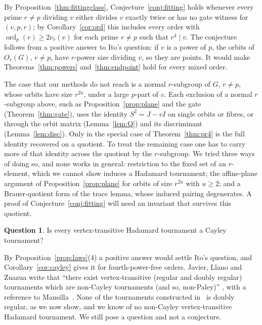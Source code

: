 \documentclass[11pt]{amsart}
\theoremstyle{definition}
\newtheorem{question}[theorem]{Question}
\theoremstyle{remark}
\begin{document}
By Proposition~\ref{thm:fittingclass}, Conjecture~\ref{conj:fitting} holds whenever every prime $r\ne p$ dividing $v$ either divides $v$ exactly twice or has no gate witness for $(v,p,r)$; by Corollary~\ref{cor:ord} this includes every order with $\operatorname{ord}_p(r)\ge2\nu_r(v)$ for each prime $r\ne p$ such that $r^4\mid v$. The conjecture follows from a positive answer to Ito's question: if $v$ is a power of $p$, the orbits of $O_r(G)$, $r\ne p$, have $r$-power size dividing $v$, so they are points. It would make Theorems~\ref{thm:powers} and~\ref{thm:endpoint} hold for every mixed order.

The case that our methods do not reach is a normal $r$-subgroup of $G$, $r\ne p$, whose orbits have size $r^{2u}$, under a large $p$-part of $v$. Each exclusion of a normal $r$-subgroup above, such as Proposition~\ref{prop:plane} and the gate (Theorem~\ref{thm:gate}), uses the identity $S^2=J-vI$ on single orbits or fibres, or through the orbit matrix (Lemma~\ref{lem:Q}) and its discriminant (Lemma~\ref{lem:disc}). Only in the special case of Theorem~\ref{thm:pr4} is the full identity recovered on a quotient. To treat the remaining case one has to carry more of that identity across the quotient by the $r$-subgroup. We tried three ways of doing so, and none works in general: restriction to the fixed set of an $r$-element, which we cannot show induces a Hadamard tournament; the affine-plane argument of Proposition~\ref{prop:plane} for orbits of size $r^{2u}$ with $u\ge2$; and a Brauer-quotient form of the trace lemma, whose induced pairing degenerates. A proof of Conjecture~\ref{conj:fitting} will need an invariant that survives this quotient.

\begin{question}\label{q:cayley}
Is every vertex-transitive Hadamard tournament a Cayley tournament?
\end{question}

By Proposition~\ref{prop:laws}(4) a positive answer would settle Ito's question, and Corollary~\ref{cor:cayley} gives it for fourth-power-free orders. Javier, Llano and Zuazua write that ``there exist vertex-transitive (regular and doubly regular) tournaments which are non-Cayley tournaments (and so, non-Paley)'' \cite[p.~74]{JLZ}, with a reference to Mansilla~\cite{Mansilla}. None of the tournaments constructed in~\cite{Mansilla} is doubly regular, as we now show, and we know of no non-Cayley vertex-transitive Hadamard tournament. We still pose a question and not a conjecture.
\end{document}

